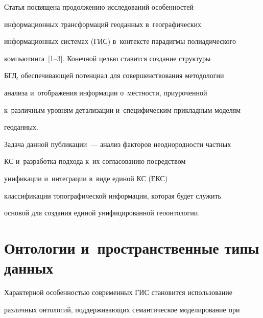      


     \vspace*{-2pt}


  


  Статья посвящена продолжению исследований особенностей 


информационных трансформаций геоданных в~географических 


информационных системах (ГИС) в~контексте парадигмы полиадического 


компьютинга~[1--3]. Конечной целью ставится создание структуры  


БГД, обеспечивающей потенциал для совершенствования методологии 


анализа и~отображения информации о~местности, приуроченной 


к~различным уровням детализации и~специфическим прикладным моделям 


геоданных\cite{4-nik}.


  


  Задача данной публикации~--- анализ факторов неоднородности частных 


КС и~разработка подхода к~их согласованию посредством 


унификации и~интеграции в~виде единой КС (ЕКС) 


классификации топографической информации, которая будет служить 


основой для создания единой унифицированной геоонтологии.





\vspace*{-6pt}


  


     \section{Онтологии и~пространственные типы данных}


     


          \vspace*{-2pt}


     


  Характерной особенностью современных ГИС становится использование 


различных онтологий, поддерживающих семантическое моделирование при 


